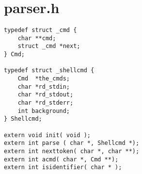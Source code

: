 \chapter{parser.h}
\begin{lstlisting}
typedef struct _cmd {
    char **cmd;
    struct _cmd *next;
} Cmd;

typedef struct _shellcmd { 
    Cmd  *the_cmds;
    char *rd_stdin;
    char *rd_stdout;
    char *rd_stderr;
    int background;
} Shellcmd;

extern void init( void );
extern int parse ( char *, Shellcmd *);
extern int nexttoken( char *, char **);
extern int acmd( char *, Cmd **);
extern int isidentifier( char * );

\end{lstlisting}